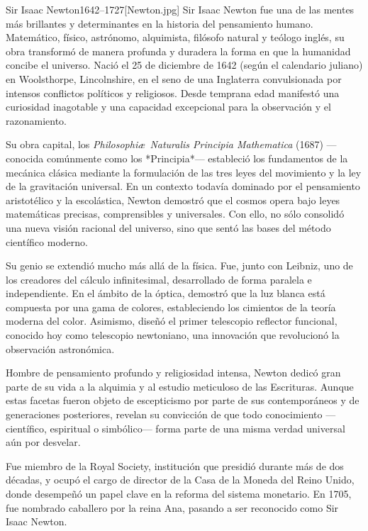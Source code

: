 \begin{semblanza}{Sir Isaac Newton}{1642–1727}[Newton.jpg]
    Sir Isaac Newton fue una de las mentes más brillantes y determinantes en la historia del pensamiento humano. Matemático, físico, astrónomo, alquimista, filósofo natural y teólogo inglés, su obra transformó de manera profunda y duradera la forma en que la humanidad concibe el universo. Nació el 25 de diciembre de 1642 (según el calendario juliano) en Woolsthorpe, Lincolnshire, en el seno de una Inglaterra convulsionada por intensos conflictos políticos y religiosos. Desde temprana edad manifestó una curiosidad inagotable y una capacidad excepcional para la observación y el razonamiento.

    Su obra capital, los \textit{Philosophi\ae\ Naturalis Principia Mathematica} (1687) —conocida comúnmente como los *Principia*— estableció los fundamentos de la mecánica clásica mediante la formulación de las tres leyes del movimiento y la ley de la gravitación universal. En un contexto todavía dominado por el pensamiento aristotélico y la escolástica, Newton demostró que el cosmos opera bajo leyes matemáticas precisas, comprensibles y universales. Con ello, no sólo consolidó una nueva visión racional del universo, sino que sentó las bases del método científico moderno.

    Su genio se extendió mucho más allá de la física. Fue, junto con Leibniz, uno de los creadores del cálculo infinitesimal, desarrollado de forma paralela e independiente. En el ámbito de la óptica, demostró que la luz blanca está compuesta por una gama de colores, estableciendo los cimientos de la teoría moderna del color. Asimismo, diseñó el primer telescopio reflector funcional, conocido hoy como telescopio newtoniano, una innovación que revolucionó la observación astronómica.

    Hombre de pensamiento profundo y religiosidad intensa, Newton dedicó gran parte de su vida a la alquimia y al estudio meticuloso de las Escrituras. Aunque estas facetas fueron objeto de escepticismo por parte de sus contemporáneos y de generaciones posteriores, revelan su convicción de que todo conocimiento —científico, espiritual o simbólico— forma parte de una misma verdad universal aún por desvelar.

    Fue miembro de la Royal Society, institución que presidió durante más de dos décadas, y ocupó el cargo de director de la Casa de la Moneda del Reino Unido, donde desempeñó un papel clave en la reforma del sistema monetario. En 1705, fue nombrado caballero por la reina Ana, pasando a ser reconocido como Sir Isaac Newton.


\end{semblanza}
